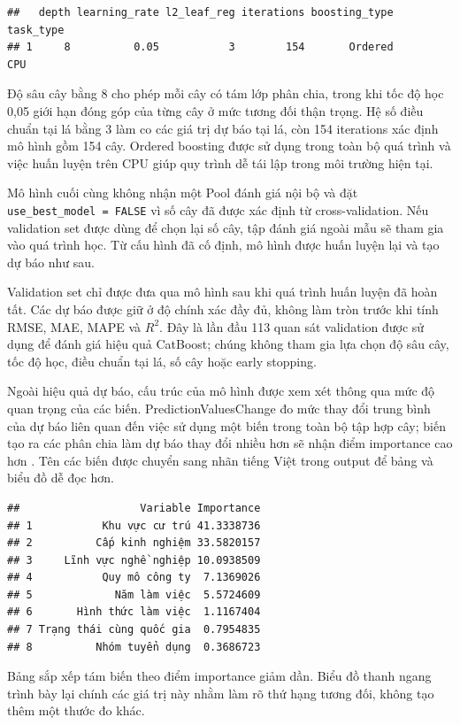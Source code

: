 \begin{verbatim}
##   depth learning_rate l2_leaf_reg iterations boosting_type task_type
## 1     8          0.05           3        154       Ordered       CPU
\end{verbatim}

Độ sâu cây bằng 8 cho phép mỗi cây có tám lớp phân chia, trong khi tốc
độ học 0,05 giới hạn đóng góp của từng cây ở mức tương đối thận trọng.
Hệ số điều chuẩn tại lá bằng 3 làm co các giá trị dự báo tại lá, còn 154
iterations xác định mô hình gồm 154 cây. Ordered boosting được sử dụng
trong toàn bộ quá trình và việc huấn luyện trên CPU giúp quy trình dễ
tái lập trong môi trường hiện tại.

Mô hình cuối cùng không nhận một Pool đánh giá nội bộ và đặt
\texttt{use\_best\_model\ =\ FALSE} vì số cây đã được xác định từ
cross-validation. Nếu validation set được dùng để chọn lại số cây, tập
đánh giá ngoài mẫu sẽ tham gia vào quá trình học. Từ cấu hình đã cố
định, mô hình được huấn luyện lại và tạo dự báo như sau.

Validation set chỉ được đưa qua mô hình sau khi quá trình huấn luyện đã
hoàn tất. Các dự báo được giữ ở độ chính xác đầy đủ, không làm tròn
trước khi tính RMSE, MAE, MAPE và \(R^2\). Đây là lần đầu 113 quan sát
validation được sử dụng để đánh giá hiệu quả CatBoost; chúng không tham
gia lựa chọn độ sâu cây, tốc độ học, điều chuẩn tại lá, số cây hoặc
early stopping.

Ngoài hiệu quả dự báo, cấu trúc của mô hình được xem xét thông qua mức
độ quan trọng của các biến. PredictionValuesChange đo mức thay đổi trung
bình của dự báo liên quan đến việc sử dụng một biến trong toàn bộ tập
hợp cây; biến tạo ra các phân chia làm dự báo thay đổi nhiều hơn sẽ nhận
điểm importance cao hơn \cite{catboost_docs}. Tên các biến được chuyển sang
nhãn tiếng Việt trong output để bảng và biểu đồ dễ đọc hơn.

\begin{verbatim}
##                   Variable Importance
## 1           Khu vực cư trú 41.3338736
## 2          Cấp kinh nghiệm 33.5820157
## 3     Lĩnh vực nghề nghiệp 10.0938509
## 4           Quy mô công ty  7.1369026
## 5             Năm làm việc  5.5724609
## 6       Hình thức làm việc  1.1167404
## 7 Trạng thái cùng quốc gia  0.7954835
## 8          Nhóm tuyển dụng  0.3686723
\end{verbatim}

Bảng sắp xếp tám biến theo điểm importance giảm dần. Biểu đồ thanh ngang
trình bày lại chính các giá trị này nhằm làm rõ thứ hạng tương đối,
không tạo thêm một thước đo khác.

